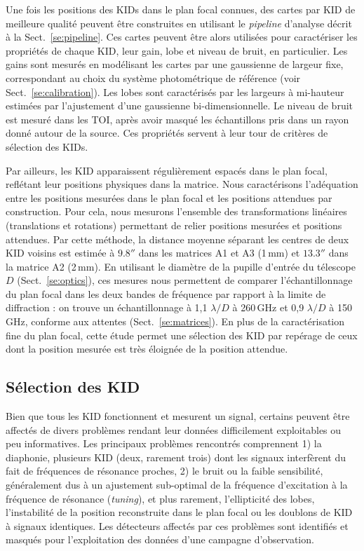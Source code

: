 Une fois les positions des KIDs dans le plan focal connues, des cartes
par KID de meilleure qualité peuvent être construites en utilisant le
\emph{pipeline} d'analyse décrit à la Sect.~\ref{se:pipeline}. Ces
cartes peuvent être alors utilisées pour caractériser les propriétés
de chaque KID, leur gain, lobe et niveau de bruit, en particulier. Les
gains sont mesurés en modélisant les cartes par une gaussienne de
largeur fixe, correspondant au choix du système photométrique de
référence (voir Sect.~\ref{se:calibration}). Les lobes sont
caractérisés par les largeurs à mi-hauteur estimées par l'ajustement
d'une gaussienne bi-dimensionnelle. Le niveau de bruit est mesuré dans
les TOI, après avoir masqué les échantillons pris dans un rayon donné
autour de la source. Ces propriétés servent à leur tour de critères de
sélection des KIDs.

Par ailleurs, les KID apparaissent régulièrement espacés dans le plan
focal, reflétant leur positions physiques dans la matrice. Nous
caractérisons l'adéquation entre les positions mesurées dans le plan
focal et les positions attendues par construction. Pour cela, nous
mesurons l'ensemble des transformations linéaires (translations et
rotations) permettant de relier positions mesurées et positions
attendues. Par cette méthode, la distance moyenne séparant les centres
de deux KID voisins est estimée à $9.8''$ dans les matrices A1 et A3
(1\,mm) et $13.3''$ dans la matrice A2 (2\,mm). En utilisant le
diamètre de la pupille d'entrée du télescope $D$ (Sect.~\ref{se:optics}),
ces mesures nous permettent de comparer l'échantillonnage du plan focal
dans les deux bandes de fréquence par rapport à la limite de
diffraction : on trouve un échantillonnage à 1,1 $\lambda/D$ à
260\,GHz et 0,9 $\lambda/D$ à 150\,GHz, conforme aux attentes
(Sect.~\ref{se:matrices}). En plus de la caractérisation fine du plan
focal, cette étude permet une sélection des KID par repérage de ceux
dont la position mesurée est très éloignée de la position attendue.   


\subsection{Sélection des KID}
\label{se:KID_selection}

Bien que tous les KID fonctionnent et mesurent un signal, certains peuvent
être affectés de divers problèmes rendant leur données difficilement
exploitables ou peu informatives. Les principaux problèmes rencontrés
comprennent 1) la diaphonie, plusieurs KID (deux, rarement trois) dont
les signaux interfèrent du fait de fréquences de résonance proches, 2)
le bruit ou la faible sensibilité, généralement dus à un ajustement
sub-optimal de la fréquence d'excitation à la fréquence de résonance
(\emph{tuning}), et plus rarement, l'ellipticité des lobes,
l'instabilité de la position reconstruite dans le plan focal ou les
doublons de KID à signaux identiques. Les détecteurs affectés par ces
problèmes sont identifiés et masqués pour l'exploitation des données
d'une campagne d'observation.

